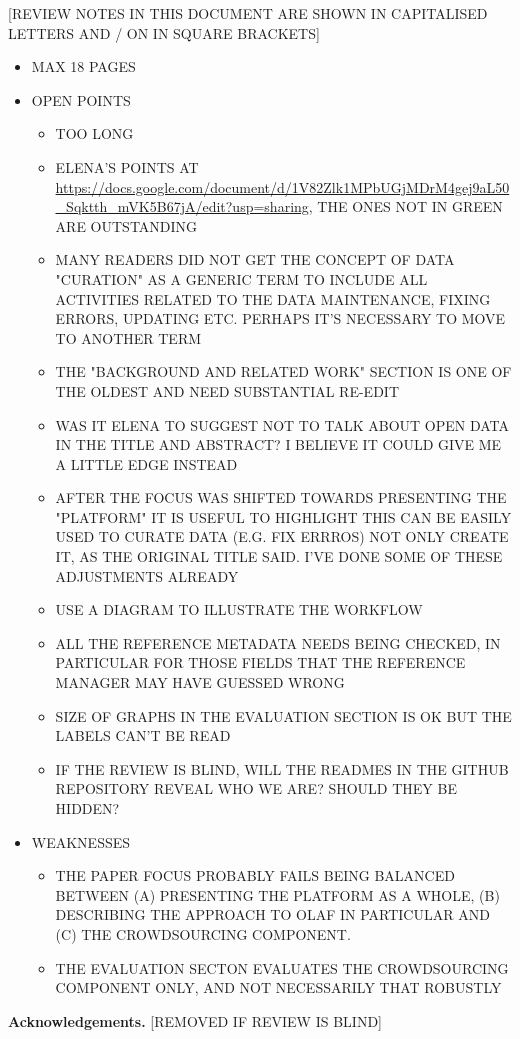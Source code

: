 \documentclass{llncs}
\begin{document}
[REVIEW NOTES IN THIS DOCUMENT ARE SHOWN IN CAPITALISED LETTERS AND / ON IN SQUARE BRACKETS] 
\begin{itemize}

    \item MAX 18 PAGES
    \item OPEN POINTS
        \begin{itemize}
            \item TOO LONG
            \item ELENA'S POINTS AT \url{https://docs.google.com/document/d/1V82Zlk1MPbUGjMDrM4gej9aL50_Sqktth_mVK5B67jA/edit?usp=sharing}, THE ONES NOT IN GREEN ARE OUTSTANDING
            \item MANY READERS DID NOT GET THE CONCEPT OF DATA "CURATION" AS A GENERIC TERM TO INCLUDE ALL ACTIVITIES RELATED TO THE DATA MAINTENANCE, FIXING ERRORS, UPDATING ETC.  PERHAPS IT'S NECESSARY TO MOVE TO ANOTHER TERM
            \item THE "BACKGROUND AND RELATED WORK" SECTION IS ONE OF THE OLDEST AND NEED SUBSTANTIAL RE-EDIT
            \item WAS IT ELENA TO SUGGEST NOT TO TALK ABOUT OPEN DATA IN THE TITLE AND ABSTRACT? I BELIEVE IT COULD GIVE ME A LITTLE EDGE INSTEAD
            \item AFTER THE FOCUS WAS SHIFTED TOWARDS PRESENTING THE "PLATFORM" IT IS USEFUL TO HIGHLIGHT THIS CAN BE EASILY USED TO CURATE DATA (E.G. FIX ERRROS) NOT ONLY CREATE IT, AS THE ORIGINAL TITLE SAID. I'VE DONE SOME OF THESE ADJUSTMENTS ALREADY
            \item USE A DIAGRAM TO ILLUSTRATE THE WORKFLOW
            \item ALL THE REFERENCE METADATA NEEDS BEING CHECKED, IN PARTICULAR FOR THOSE FIELDS THAT THE REFERENCE MANAGER MAY HAVE GUESSED WRONG
            \item SIZE OF GRAPHS IN THE EVALUATION SECTION IS OK BUT THE LABELS CAN'T BE READ
            \item IF THE REVIEW IS BLIND, WILL THE READMES IN THE GITHUB REPOSITORY REVEAL WHO WE ARE? SHOULD THEY BE HIDDEN?
        \end{itemize}
    \item WEAKNESSES 
        \begin{itemize}
            \item THE PAPER FOCUS PROBABLY FAILS BEING BALANCED BETWEEN (A) PRESENTING THE PLATFORM AS A WHOLE, (B) DESCRIBING THE APPROACH TO OLAF IN PARTICULAR AND (C) THE CROWDSOURCING COMPONENT.  
            \item THE EVALUATION SECTON EVALUATES THE CROWDSOURCING COMPONENT ONLY, AND NOT NECESSARILY THAT ROBUSTLY
        \end{itemize}
\end{itemize}









\textbf{Acknowledgements.} [REMOVED IF REVIEW IS BLIND]


\end{document}

